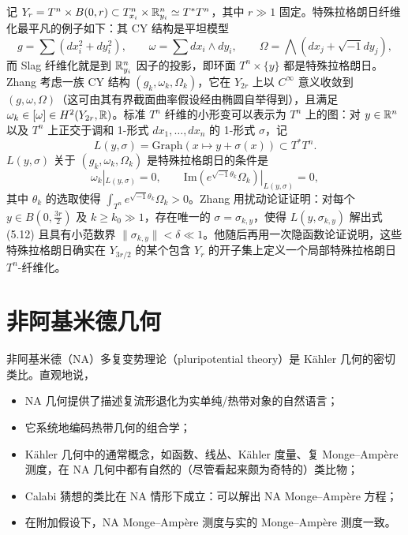 记 $Y_r=T^n\times B(0,r)\subset T^n_{x_i}\times\mathbb{R}^n_{y_i}\simeq T^*T^n$，其中 $r\gg 1$ 固定。特殊拉格朗日纤维化最平凡的例子如下：其 CY 结构是平坦模型
\[
g=\sum (dx_i^2+dy_i^2),\qquad \omega=\sum dx_i\wedge dy_i,\qquad \Omega=\bigwedge (dx_j+\sqrt{-1}dy_j),
\]
而 Slag 纤维化就是到 $\mathbb{R}^n_{y_i}$ 因子的投影，即环面 $T^n\times\{y\}$ 都是特殊拉格朗日。Zhang 考虑一族 CY 结构 $(g_k,\omega_k,\Omega_k)$，它在 $Y_{2r}$ 上以 $C^\infty$ 意义收敛到 $(g,\omega,\Omega)$（这可由其有界截面曲率假设经由椭圆自举得到），且满足 $\omega_k\in[\omega]\in H^2(Y_{2r},\mathbb{R})$。标准 $T^n$ 纤维的小形变可以表示为 $T^n$ 上的图：对 $y\in\mathbb{R}^n$ 以及 $T^n$ 上正交于调和 1-形式 $dx_1,\dots,dx_n$ 的 1-形式 $\sigma$，记
\[
L(y,\sigma)=\mathrm{Graph}(x\mapsto y+\sigma(x))\subset T^*T^n.
\]
$L(y,\sigma)$ 关于 $(g_k,\omega_k,\Omega_k)$ 是特殊拉格朗日的条件是
\begin{equation}
\omega_k|_{L(y,\sigma)}=0,\qquad \mathrm{Im}(e^{\sqrt{-1}\theta_k}\Omega_k)|_{L(y,\sigma)}=0, \tag{5.12}
\end{equation}
其中 $\theta_k$ 的选取使得 $\int_{T^n}e^{\sqrt{-1}\theta_k}\Omega_k>0$。Zhang 用扰动论证证明：对每个 $y\in B(0,\frac{3r}{2})$ 及 $k\ge k_0\gg 1$，存在唯一的 $\sigma=\sigma_{k,y}$，使得 $L(y,\sigma_{k,y})$ 解出式 (5.12) 且具有小范数界 $\|\sigma_{k,y}\|<\delta\ll 1$。他随后再用一次隐函数论证说明，这些特殊拉格朗日确实在 $Y_{3r/2}$ 的某个包含 $Y_r$ 的开子集上定义一个局部特殊拉格朗日 $T^n$-纤维化。


\section{非阿基米德几何}
非阿基米德（NA）多复变势理论（pluripotential theory）是 Kähler 几何的密切类比。直观地说，
\begin{itemize}
\item NA 几何提供了描述复流形退化为实单纯/热带对象的自然语言；
\item 它系统地编码热带几何的组合学；
\item Kähler 几何中的通常概念，如函数、线丛、Kähler 度量、复 Monge--Ampère 测度，在 NA 几何中都有自然的（尽管看起来颇为奇特的）类比物；
\item Calabi 猜想的类比在 NA 情形下成立：可以解出 NA Monge--Ampère 方程；
\item 在附加假设下，NA Monge--Ampère 测度与实的 Monge--Ampère 测度一致。
\end{itemize}

